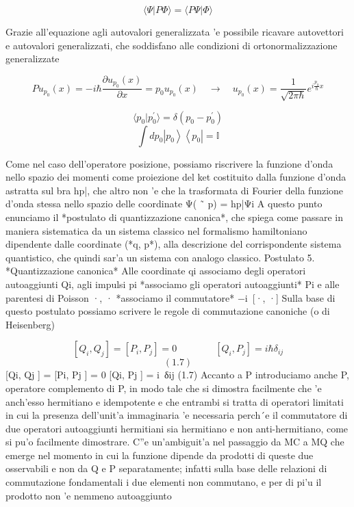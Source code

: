 {	$$\langle\Psi|P\Phi\rangle=\langle P\Psi|\Phi\rangle$$
	
	Grazie all'equazione agli autovalori generalizzata 'e possibile ricavare autovettori e autovalori generalizzati, che soddisfano alle condizioni di ortonormalizzazione generalizzate
	
	$$P u_{p_{0}}(x)=-i\hbar{\frac{\partial u_{p_{0}}(x)}{\partial x}}=p_{0}u_{p_{0}}(x)\quad\longrightarrow\quad u_{p_{0}}(x)={\frac{1}{\sqrt{2\pi\hbar}}}e^{i{\frac{p_{0}}{\hbar}}x}$$
	
	$$\langle p_{0}|p_{0}^{\prime}\rangle=\delta(p_{0}-p_{0}^{\prime})$$
	$$\int d p_{0}\left|p_{0}\right\rangle\left\langle p_{0}\right|=\mathbb{I}$$
	
	Come nel caso dell'operatore posizione, possiamo riscrivere la funzione d'onda nello spazio dei momenti come proiezione del ket costituito dalla funzione d'onda astratta sul bra hp|, che altro non 'e che la trasformata di Fourier della funzione d'onda stessa nello spazio delle coordinate Ψ( ˜ p) = hp|Ψi A questo punto enunciamo il *postulato di quantizzazione canonica*, che spiega come passare in maniera sistematica da un sistema classico nel formalismo hamiltoniano dipendente dalle coordinate (*q, p*), alla descrizione del corrispondente sistema quantistico, che quindi sar'a un sistema con analogo classico. Postulato 5. *Quantizzazione canonica* Alle coordinate qi associamo degli operatori autoaggiunti Qi, agli impulsi pi *associamo gli operatori autoaggiunti* Pi e alle parentesi di Poisson {·, ·} *associamo il commutatore* −i~[·, ·]
	Sulla base di questo postulato possiamo scrivere le regole di commutazione canoniche (o di Heisenberg)
	
	$$[Q_{i},Q_{j}]=[P_{i},P_{j}]=0\qquad\qquad[Q_{i},P_{j}]=i\hbar\delta_{i j}$$
	$$(1.7)$$
	[Qi, Qj ] = [Pi, Pj ] = 0 [Qi, Pj ] = i~δij (1.7)
	Accanto a P introduciamo anche P, operatore complemento di P, in modo tale che
	si dimostra facilmente che 'e anch'esso hermitiano e idempotente
	e che entrambi si tratta di operatori limitati
	in cui la presenza dell'unit'a immaginaria 'e necessaria perch´e il commutatore di due operatori autoaggiunti hermitiani sia hermitiano e non anti-hermitiano, come si pu'o facilmente dimostrare. C''e un'ambiguit'a nel passaggio da MC a MQ che emerge nel momento in cui la funzione dipende da prodotti di queste due osservabili e non da Q e P separatamente; infatti sulla base delle relazioni di commutazione fondamentali i due elementi non commutano, e per di pi'u il prodotto non 'e nemmeno autoaggiunto
	
}
